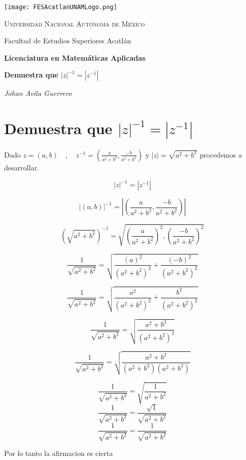 \documentclass[a4paper,12pt]{article}
\begin{document}
\begin{titlepage}
    \centering
    \texttt{[image: FESAcatlanUNAMLogo.png]} %
    \vspace{1cm}
    
    {\scshape\large Universidad Nacional Autónoma de México \par}
    {\large Facultad de Estudios Superiores Acatlán \par}
    \vspace{1.5cm}
    
    {\Large\bfseries Licenciatura en Matemáticas Aplicadas \par}
    \vspace{2cm}
    
    {\Huge\bfseries Demuestra que  \(|z|^{-1} = |z^{-1}| \)

    \par}
    \vspace{2cm}
    
    {\Large\itshape Johan Avila Guerrero \par}
    \vfill
    
    
    \vfill
    
\end{titlepage}



\section{Demuestra que \(|z|^{-1} = |z^{-1}|\) }
Dado \(z=(a,b) \quad , \quad z^{-1} = ( \frac{a}{a^2+b^2}, \frac{-b}{a^2+b^2} )  \) y  \(|z|=\sqrt{a^2 + b^2 } \)  procedemos a desarrollar.

\[|z|^{-1} = |z^{-1}|\] 

\[|(a,b)|^{-1} = |( \frac{a}{a^2+b^2}, \frac{-b}{a^2+b^2} )|\]

\[(\sqrt{a^2 + b^2})^{-1} = \sqrt{ (\frac{a}{a^2+b^2})^2, (\frac{-b}{a^2+b^2} )^2} \] 

\[ \frac{1}{\sqrt{a^2 + b^2}}  =  \sqrt{ \frac{(a)^2}{(a^2+b^2)^2} + \frac{(-b)^2}{(a^2+b^2)^2}}  \] 

\[ \frac{1}{\sqrt{a^2 + b^2}}  =  \sqrt{ \frac{a^2}{(a^2+b^2)^2} + \frac{b^2}{(a^2+b^2)^2}}  \] 

\[ \frac{1}{\sqrt{a^2 + b^2}}  =  \sqrt{  \frac{a^2+b^2}{(a^2+b^2)^2}}  \]

\[ \frac{1}{\sqrt{a^2 + b^2}}  =  \sqrt{  \frac{a^2+b^2}{(a^2+b^2)(a^2+b^2)}}  \] 

\[ \frac{1}{\sqrt{a^2 + b^2}}  =  \sqrt{  \frac{1}{a^2+b^2}}  \] 
\[ \frac{1}{\sqrt{a^2 + b^2}}  =    \frac{\sqrt{1}}{ \sqrt{a^2+b^2}}   \] 
\[ \frac{1}{\sqrt{a^2 + b^2}}  =    \frac{1}{ \sqrt{a^2+b^2}}   \] 



Por lo tanto la afirmacion es cierta
\end{document}
